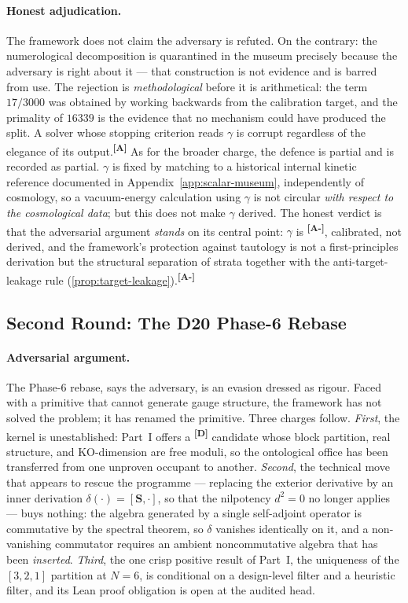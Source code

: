 \documentclass[12pt,a4paper,twoside]{article}
\theoremstyle{plain}
\theoremstyle{definition}
\theoremstyle{remark}
\newcommand{\catmark}[1]{\textsuperscript{\textsf{\textbf{[#1]}}}}
\begin{document}
\paragraph{Honest adjudication.}
The framework does not claim the adversary is refuted. On the contrary:
the numerological decomposition is quarantined in the museum precisely
because the adversary is right about it --- that construction is not
evidence and is barred from use. The rejection is \emph{methodological}
before it is arithmetical: the term $17/3000$ was obtained by working
backwards from the calibration target, and the primality of $16339$ is
the evidence that no mechanism could have produced the split. A solver
whose stopping criterion reads $\gamma$ is corrupt regardless of the
elegance of its output.\catmark{A} As for the broader charge, the defence
is partial and is recorded as partial. $\gamma$ is fixed by matching to
a historical internal kinetic reference documented in
Appendix~\ref{app:scalar-museum}, independently of cosmology, so a
vacuum-energy calculation using $\gamma$ is not circular \emph{with
respect to the cosmological data}; but this does not make $\gamma$
derived. The honest verdict is that the adversarial argument
\emph{stands} on its central point: $\gamma$ is \catmark{A-}, calibrated,
not derived, and the framework's protection against tautology is not a
first-principles derivation but the structural separation of strata
together with the anti-target-leakage rule
(\cref{prop:target-leakage}).\catmark{A-}

\subsection{Second Round: The D20 Phase-6 Rebase}
\label{subsec:adversary-d19}

\paragraph{Adversarial argument.}
The Phase-6 rebase, says the adversary, is an evasion dressed as
rigour. Faced with a primitive that cannot generate gauge structure, the
framework has not solved the problem; it has renamed the primitive.
Three charges follow. \emph{First}, the kernel is unestablished: Part~I
offers a \catmark{D} candidate whose block partition, real structure, and
KO-dimension are free moduli, so the ontological office has been
transferred from one unproven occupant to another. \emph{Second}, the
technical move that appears to rescue the programme --- replacing the
exterior derivative by an inner derivation $\delta(\cdot) = [\mathbf
S,\cdot]$, so that the nilpotency $d^2=0$ no longer applies --- buys
nothing: the algebra generated by a single self-adjoint operator is
commutative by the spectral theorem, so $\delta$ vanishes identically on
it, and a non-vanishing commutator requires an ambient noncommutative
algebra that has been \emph{inserted}. \emph{Third}, the one crisp
positive result of Part~I, the uniqueness of the $[3,2,1]$ partition at
$N=6$, is conditional on a design-level filter and a heuristic filter,
and its Lean proof obligation is open at the audited head.
\end{document}

